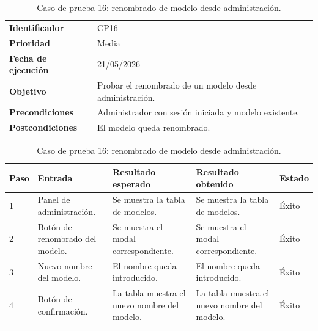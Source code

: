 \begin{table}[]
	\centering
	\footnotesize
	\renewcommand{\arraystretch}{1.2}
	\begin{tabularx}{\textwidth}{p{3.2cm} X}
		\toprule
		\textbf{Identificador} & CP16 \\
		\textbf{Prioridad} & Media \\
		\textbf{Fecha de ejecución} & 21/05/2026 \\
		\textbf{Objetivo} & Probar el renombrado de un modelo desde administración. \\
		\textbf{Precondiciones} & Administrador con sesión iniciada y modelo existente. \\
		\textbf{Postcondiciones} & El modelo queda renombrado. \\
		\midrule
	\end{tabularx}
	\begin{tabularx}{\textwidth}{p{0.8cm} p{3.2cm} X X p{1.3cm}}
		\textbf{Paso} & \textbf{Entrada} & \textbf{Resultado esperado} & \textbf{Resultado obtenido} & \textbf{Estado} \\
		\midrule
		1 & Panel de administración. & Se muestra la tabla de modelos. & Se muestra la tabla de modelos. & Éxito \\
		2 & Botón de renombrado del modelo. & Se muestra el modal correspondiente. & Se muestra el modal correspondiente. & Éxito \\
		3 & Nuevo nombre del modelo. & El nombre queda introducido. & El nombre queda introducido. & Éxito \\
		4 & Botón de confirmación. & La tabla muestra el nuevo nombre del modelo. & La tabla muestra el nuevo nombre del modelo. & Éxito \\
		\bottomrule
	\end{tabularx}
	\caption{Caso de prueba 16: renombrado de modelo desde administración.}
	\label{tab:cp16}
\end{table}

